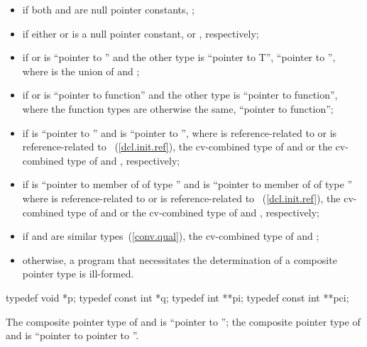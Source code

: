 \begin{itemize}
\item
if both  and  are null pointer constants,
;

\item
if either  or  is a null pointer constant,  or ,
respectively;

\item
if  or  is ``pointer to  '' and the
other type is ``pointer to  T'', ``pointer to 
'', where  is the union of 
and ;

\item
if  or  is ``pointer to  function'' and the
other type is ``pointer to function'', where the function types are otherwise the same,
``pointer to function'';

\item
if  is ``pointer to  '' and  is ``pointer to
 '', where  is reference-related to  or  is
reference-related to ~(\ref{dcl.init.ref}), the cv-combined type
of  and  or the cv-combined type of  and ,
respectively;

\item
if  is ``pointer to member of  of type  '' and  is
``pointer to member of  of type  '' where  is
reference-related to  or  is reference-related to
~(\ref{dcl.init.ref}), the cv-combined type of  and  or the cv-combined type
of  and , respectively;

\item
if  and  are similar types~(\ref{conv.qual}), the cv-combined type of  and
;

\item
otherwise, a program that necessitates the determination of a
composite pointer type is ill-formed.
\end{itemize}

\begin{example}
\begin{codeblock}
typedef void *p;
typedef const int *q;
typedef int **pi;
typedef const int **pci;
\end{codeblock}

The composite pointer type of  and  is ``pointer to ''; the
composite pointer type of  and  is ``pointer to  pointer to
''.
\end{example}

